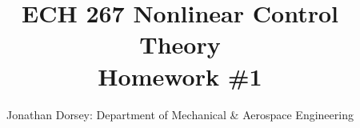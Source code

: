 \documentclass[12px]{article}
\begin{document}
    \title{ECH 267 Nonlinear Control Theory \\ Homework \#1  }

    \author{Jonathan Dorsey: Department of Mechanical \& Aerospace Engineering}

    \maketitle























\end{document}
